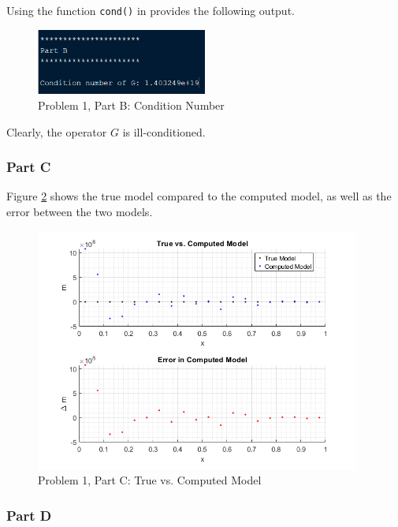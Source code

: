 Using the function \texttt{cond()} in \MATLAB provides the following output.

\begin{figure}[h] \label{fig: prob 1 part b}
	\centering
	\includegraphics[width=0.5\textwidth]{./images/prob1_partb.png}
	\caption{Problem 1, Part B: Condition Number}
\end{figure}
\FloatBarrier

Clearly, the operator $G$ is ill-conditioned.


\subsubsection{Part C}

Figure \ref{fig: prob 1 part c} shows the true model compared to the computed model, as well as the error between the two models. 

\begin{figure}[h] \label{fig: prob 1 part c}
	\centering
	\includegraphics[width=0.95\textwidth]{./images/prob1_partc.png}
	\caption{Problem 1, Part C: True vs. Computed Model}
\end{figure}
\FloatBarrier


\subsubsection{Part D}

